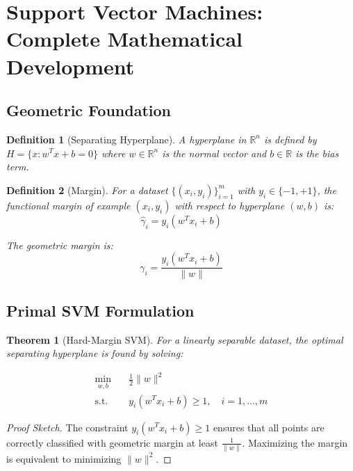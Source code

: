 \documentclass[12pt, a4paper]{article}
\newtheorem{theorem}{Theorem}
\newtheorem{definition}{Definition}
\begin{document}
\section{Support Vector Machines: Complete Mathematical Development}

\subsection{Geometric Foundation}

\begin{definition}[Separating Hyperplane]
A hyperplane in $\mathbb{R}^n$ is defined by $H = \{x : w^Tx + b = 0\}$ where $w \in \mathbb{R}^n$ is the normal vector and $b \in \mathbb{R}$ is the bias term.
\end{definition}

\begin{definition}[Margin]
For a dataset $\{(x_i, y_i)\}_{i=1}^m$ with $y_i \in \{-1, +1\}$, the functional margin of example $(x_i, y_i)$ with respect to hyperplane $(w,b)$ is:
\begin{equation}
\hat{\gamma}_i = y_i(w^Tx_i + b)
\end{equation}

The geometric margin is:
\begin{equation}
\gamma_i = \frac{y_i(w^Tx_i + b)}{\|w\|}
\end{equation}
\end{definition}

\subsection{Primal SVM Formulation}

\begin{theorem}[Hard-Margin SVM]
For a linearly separable dataset, the optimal separating hyperplane is found by solving:

\begin{align}
\min_{w,b} &\quad \frac{1}{2}\|w\|^2 \\
\text{s.t.} &\quad y_i(w^Tx_i + b) \geq 1, \quad i = 1, \ldots, m
\end{align}
\end{theorem}

\begin{proof}[Proof Sketch]
The constraint $y_i(w^Tx_i + b) \geq 1$ ensures that all points are correctly classified with geometric margin at least $\frac{1}{\|w\|}$. Maximizing the margin is equivalent to minimizing $\|w\|^2$.
\end{proof}
\end{document}
